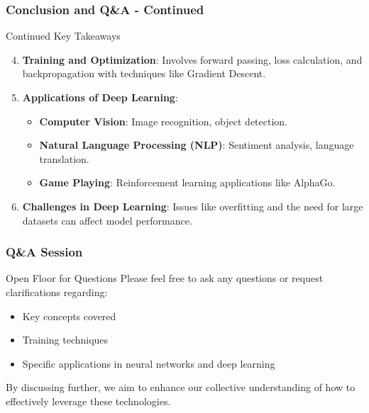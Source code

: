 \documentclass[aspectratio=169]{beamer}
\begin{document}
\begin{frame}[fragile]
  \frametitle{Conclusion and Q\&A - Continued}
  \begin{block}{Continued Key Takeaways}
    \begin{enumerate}
      \setcounter{enumi}{3}
      \item \textbf{Training and Optimization}:
      Involves forward passing, loss calculation, and backpropagation with techniques like Gradient Descent.
      
      \item \textbf{Applications of Deep Learning}:
      \begin{itemize}
        \item \textbf{Computer Vision}: Image recognition, object detection.
        \item \textbf{Natural Language Processing (NLP)}: Sentiment analysis, language translation.
        \item \textbf{Game Playing}: Reinforcement learning applications like AlphaGo.
      \end{itemize}
      
      \item \textbf{Challenges in Deep Learning}:
      Issues like overfitting and the need for large datasets can affect model performance.
    \end{enumerate}
  \end{block}
\end{frame}

\begin{frame}[fragile]
  \frametitle{Q\&A Session}
  \begin{block}{Open Floor for Questions}
    Please feel free to ask any questions or request clarifications regarding:
    \begin{itemize}
      \item Key concepts covered
      \item Training techniques
      \item Specific applications in neural networks and deep learning
    \end{itemize}
    By discussing further, we aim to enhance our collective understanding of how to effectively leverage these technologies.
  \end{block}
\end{frame}
\end{document}
